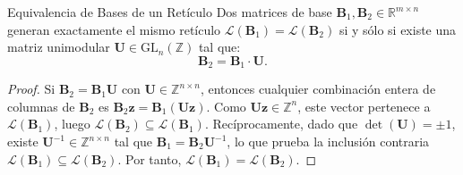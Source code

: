 \documentclass[11pt,a4paper,twoside,openright]{book}
\theoremstyle{plain}
\theoremstyle{definition}
\theoremstyle{remark}
\newcommand{\Z}{\mathbb{Z}}
\newcommand{\R}{\mathbb{R}}
\newcommand{\vv}[1]{\mathbf{#1}}
\newcommand{\mm}[1]{\mathbf{#1}}
\begin{document}
\begin{miteo}{Equivalencia de Bases de un Ret\'iculo}
Dos matrices de base $\mm{B}_1, \mm{B}_2 \in \R^{m \times n}$ generan exactamente el mismo ret\'iculo $\mathcal{L}(\mm{B}_1) = \mathcal{L}(\mm{B}_2)$ si y s\'olo si existe una matriz unimodular $\mm{U} \in \mathrm{GL}_n(\Z)$ tal que:
\[
  \mm{B}_2 = \mm{B}_1 \cdot \mm{U}.
\]
\end{miteo}

\begin{proof}
Si $\mm{B}_2 = \mm{B}_1 \mm{U}$ con $\mm{U} \in \Z^{n \times n}$, entonces cualquier combinaci\'on entera de columnas de $\mm{B}_2$ es $\mm{B}_2 \vv{z} = \mm{B}_1 (\mm{U} \vv{z})$. Como $\mm{U}\vv{z} \in \Z^n$, este vector pertenece a $\mathcal{L}(\mm{B}_1)$, luego $\mathcal{L}(\mm{B}_2) \subseteq \mathcal{L}(\mm{B}_1)$. 
Rec\'iprocamente, dado que $\det(\mm{U}) = \pm 1$, existe $\mm{U}^{-1} \in \Z^{n \times n}$ tal que $\mm{B}_1 = \mm{B}_2 \mm{U}^{-1}$, lo que prueba la inclusi\'on contraria $\mathcal{L}(\mm{B}_1) \subseteq \mathcal{L}(\mm{B}_2)$. Por tanto, $\mathcal{L}(\mm{B}_1) = \mathcal{L}(\mm{B}_2)$.
\end{proof}
\end{document}
